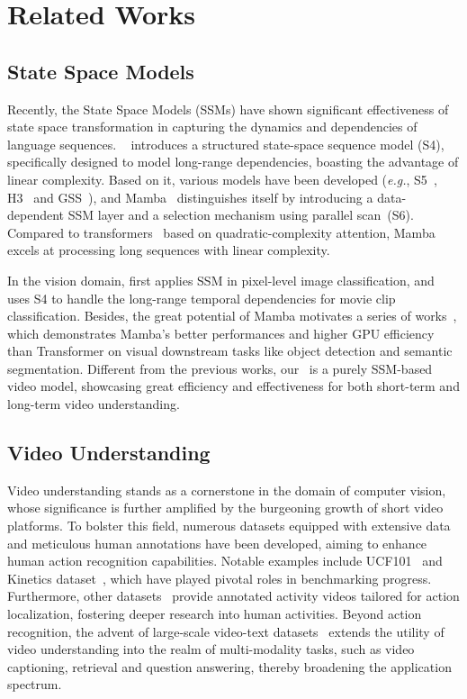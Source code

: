 \section{Related Works}

\subsection{State Space Models}

Recently, the State Space Models (SSMs) have shown significant effectiveness of state space transformation in capturing the dynamics and dependencies of language sequences.
~\cite{ssms4} introduces a structured state-space sequence model (S4), specifically designed to model long-range dependencies, boasting the advantage of linear complexity. 
Based on it,
various models have been developed
(\textit{e.g.}, S5~\cite{ssms5}, H3~\cite{h3layer} and GSS~\cite{mehta2022long}),
and Mamba~\cite{gu2023mamba} distinguishes itself 
by introducing a data-dependent SSM layer and a selection mechanism using parallel scan~(S6).
Compared to transformers~\cite{lu2019vilbert,gpt3} based on quadratic-complexity attention, 
Mamba excels at processing long sequences with linear complexity.

In the vision domain,
\cite{ssms4} first applies SSM in pixel-level image classification,
and \cite{vis4mer} uses S4 to handle the long-range temporal dependencies for movie clip classification.
Besides,
the great potential of Mamba motivates a series of works~\cite{vim,vmamba,liang2024pointmamba,vivim,guo2024mambair,he2024pan,wang2024graph},
which demonstrates Mamba's better performances and higher GPU efficiency than Transformer on visual downstream tasks like object detection and semantic segmentation. 
Different from the previous works,
our \ModelName\ is a purely SSM-based video model,
showcasing great efficiency and effectiveness for both short-term and long-term video understanding.


\subsection{Video Understanding}

Video understanding stands as a cornerstone in the domain of computer vision, 
whose significance is further amplified by the burgeoning growth of short video platforms. 
To bolster this field, 
numerous datasets equipped with extensive data and meticulous human annotations have been developed, aiming to enhance human action recognition capabilities. 
Notable examples include UCF101~\cite{ucf101} and Kinetics dataset~\cite{k400,k600,k700}, 
which have played pivotal roles in benchmarking progress. 
Furthermore, other datasets~\cite{activitynet,thumos,charades_sta,ava,finegym,liu2022fineaction} provide annotated activity videos tailored for action localization,
fostering deeper research into human activities.
Beyond action recognition, 
the advent of large-scale video-text datasets~\cite{msrvtt,msvd,activitynet_qa,youcook2, miech2019howto100m,internvid} extends the utility of video understanding into the realm of multi-modality tasks,
such as video captioning, retrieval and question answering,
thereby broadening the application spectrum. 

